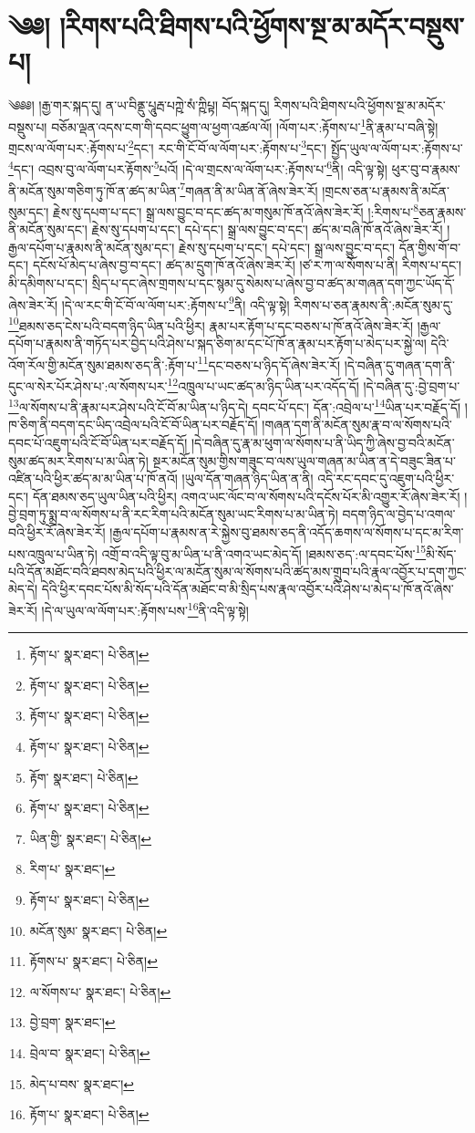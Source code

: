 \setcounter{footnote}{0} 
\chapter{༄༅། །རིགས་པའི་ཐིགས་པའི་ཕྱོགས་སྔ་མ་མདོར་བསྡུས་པ།}༄༅༅། །རྒྱ་གར་སྐད་དུ། ན་ཡ་བིནྡུ་པཱུརྦ་པཀྵེ་སཾ་ཀྵིཔྟ། བོད་སྐད་དུ། རིགས་པའི་ཐིགས་པའི་ཕྱོགས་སྔ་མ་མདོར་བསྡུས་པ། བཅོམ་ལྡན་འདས་ངག་གི་དབང་ཕྱུག་ལ་ཕྱག་འཚལ་ལོ། །ལོག་པར་:རྟོགས་པ་\footnote{རྟོག་པ་  སྣར་ཐང་།  པེ་ཅིན། }ནི་རྣམ་པ་བཞི་སྟེ། གྲངས་ལ་ལོག་པར་:རྟོགས་པ་\footnote{རྟོག་པ་  སྣར་ཐང་།  པེ་ཅིན། }དང་། རང་གི་ངོ་བོ་ལ་ལོག་པར་:རྟོགས་པ་\footnote{རྟོག་པ་  སྣར་ཐང་།  པེ་ཅིན། }དང་། སྤྱོད་ཡུལ་ལ་ལོག་པར་:རྟོགས་པ་\footnote{རྟོག་པ་  སྣར་ཐང་།  པེ་ཅིན། }དང་། འབྲས་བུ་ལ་ལོག་པར་རྟོགས་\footnote{རྟོག་  སྣར་ཐང་།  པེ་ཅིན། }པའོ། །དེ་ལ་གྲངས་ལ་ལོག་པར་:རྟོགས་པ་\footnote{རྟོག་པ་  སྣར་ཐང་།  པེ་ཅིན། }ནི། འདི་ལྟ་སྟེ། ཕུར་བུ་བ་རྣམས་ནི་མངོན་སུམ་གཅིག་ཏུ་ཁོ་ན་ཚད་མ་ཡིན་\footnote{ཡིན་གྱི་  སྣར་ཐང་།  པེ་ཅིན། }གཞན་ནི་མ་ཡིན་ནོ་ཞེས་ཟེར་རོ། །གྲངས་ཅན་པ་རྣམས་ནི་མངོན་སུམ་དང་། རྗེས་སུ་དཔག་པ་དང་། སྒྲ་ལས་བྱུང་བ་དང་ཚད་མ་གསུམ་ཁོ་ནའོ་ཞེས་ཟེར་རོ། །:རིགས་པ་\footnote{རིག་པ་  སྣར་ཐང་། }ཅན་རྣམས་ནི་མངོན་སུམ་དང་། རྗེས་སུ་དཔག་པ་དང་། དཔེ་དང་། སྒྲ་ལས་བྱུང་བ་དང་། ཚད་མ་བཞི་ཁོ་ནའོ་ཞེས་ཟེར་རོ། །རྒྱལ་དཔོག་པ་རྣམས་ནི་མངོན་སུམ་དང་། རྗེས་སུ་དཔག་པ་དང་། དཔེ་དང་། སྒྲ་ལས་བྱུང་བ་དང་། དོན་གྱིས་གོ་བ་དང་། དངོས་པོ་མེད་པ་ཞེས་བྱ་བ་དང་། ཚད་མ་དྲུག་ཁོ་ནའོ་ཞེས་ཟེར་རོ། །ཙ་ར་ཀ་ལ་སོགས་པ་ནི། རིགས་པ་དང་། མི་དམིགས་པ་དང་། སྲིད་པ་དང་ཞེས་གྲགས་པ་དང་སྙམ་དུ་སེམས་པ་ཞེས་བྱ་བ་ཚད་མ་གཞན་དག་ཀྱང་ཡོད་དོ་ཞེས་ཟེར་རོ། །དེ་ལ་རང་གི་ངོ་བོ་ལ་ལོག་པར་:རྟོགས་པ་\footnote{རྟོག་པ་  སྣར་ཐང་།  པེ་ཅིན། }ནི། འདི་ལྟ་སྟེ། རིགས་པ་ཅན་རྣམས་ནི་:མངོན་སུམ་དུ་\footnote{མངོན་སུམ་  སྣར་ཐང་།  པེ་ཅིན། }ཐམས་ཅད་ངེས་པའི་བདག་ཉིད་ཡིན་པའི་ཕྱིར། རྣམ་པར་རྟོག་པ་དང་བཅས་པ་ཁོ་ནའོ་ཞེས་ཟེར་རོ། །རྒྱལ་དཔོག་པ་རྣམས་ནི་གཏོད་པར་བྱེད་པའི་ཤེས་པ་སྐད་ཅིག་མ་དང་པོ་ཁོ་ན་རྣམ་པར་རྟོག་པ་མེད་པར་སྐྱེ་ལ། དེའི་འོག་རོལ་གྱི་མངོན་སུམ་ཐམས་ཅད་ནི་:རྟོག་པ་\footnote{རྟོགས་པ་  སྣར་ཐང་།  པེ་ཅིན། }དང་བཅས་པ་ཉིད་དོ་ཞེས་ཟེར་རོ། །དེ་བཞིན་དུ་གཞན་དག་ནི་དུང་ལ་སེར་པོར་ཤེས་པ་:ལ་སོགས་པར་\footnote{ལ་སོགས་པ་  སྣར་ཐང་།  པེ་ཅིན། }འཁྲུལ་པ་ཡང་ཚད་མ་ཉིད་ཡིན་པར་འདོད་དོ། །དེ་བཞིན་དུ་:བྱེ་བྲག་པ་\footnote{བྱེ་བྲག་  སྣར་ཐང་། }ལ་སོགས་པ་ནི་རྣམ་པར་ཤེས་པའི་ངོ་བོ་མ་ཡིན་པ་ཉིད་དེ། དབང་པོ་དང་། དོན་:འབྲེལ་པ་\footnote{བྲེལ་བ་  སྣར་ཐང་།  པེ་ཅིན། }ཡིན་པར་བརྗོད་དོ། །ཁ་ཅིག་ནི་བདག་དང་ཡིད་འབྲེལ་པའི་ངོ་བོ་ཡིན་པར་བརྗོད་དོ། །གཞན་དག་ནི་མངོན་སུམ་རྣ་བ་ལ་སོགས་པའི་དབང་པོ་འཇུག་པའི་ངོ་བོ་ཡིན་པར་བརྗོད་དོ། །དེ་བཞིན་དུ་རྣ་མ་ཕུག་ལ་སོགས་པ་ནི་ཡིད་ཀྱི་ཞེས་བྱ་བའི་མངོན་སུམ་ཚད་མར་རིགས་པ་མ་ཡིན་ཏེ། སྔར་མངོན་སུམ་གྱིས་གཟུང་བ་ལས་ཡུལ་གཞན་མ་ཡིན་ན་དེ་བཟུང་ཟིན་པ་འཛིན་པའི་ཕྱིར་ཚད་མ་མ་ཡིན་པ་ཁོ་ནའོ། །ཡུལ་དོན་གཞན་ཉིད་ཡིན་ན་ནི། འདི་རང་དབང་དུ་འཇུག་པའི་ཕྱིར་དང་། དོན་ཐམས་ཅད་ཡུལ་ཡིན་པའི་ཕྱིར། འགའ་ཡང་ལོང་བ་ལ་སོགས་པའི་དངོས་པོར་མི་འགྱུར་རོ་ཞེས་ཟེར་རོ། །བྱེ་བྲག་ཏུ་སྨྲ་བ་ལ་སོགས་པ་ནི་རང་རིག་པའི་མངོན་སུམ་ཡང་རིགས་པ་མ་ཡིན་ཏེ། བདག་ཉིད་ལ་བྱེད་པ་འགལ་བའི་ཕྱིར་རོ་ཞེས་ཟེར་རོ། །རྒྱལ་དཔོག་པ་རྣམས་ན་རེ་སྐྱེས་བུ་ཐམས་ཅད་ནི་འདོད་ཆགས་ལ་སོགས་པ་དང་མ་རིག་པས་འཁྲུལ་པ་ཡིན་ཏེ། འགྲོ་བ་འདི་ལྟ་བུ་མ་ཡིན་པ་ནི་འགའ་ཡང་མེད་དོ། །ཐམས་ཅད་:ལ་དབང་པོས་\footnote{མེད་པ་བས་  སྣར་ཐང་། }མི་སོད་པའི་དོན་མཐོང་བའི་ཐབས་མེད་པའི་ཕྱིར་ལ་མངོན་སུམ་ལ་སོགས་པའི་ཚད་མས་གྲུབ་པའི་རྣལ་འབྱོར་པ་དག་ཀྱང་མེད་དེ། དེའི་ཕྱིར་དབང་པོས་མི་སོད་པའི་དོན་མཐོང་བ་མི་སྲིད་པས་རྣལ་འབྱོར་པའི་ཤེས་པ་མེད་པ་ཁོ་ནའོ་ཞེས་ཟེར་རོ། །དེ་ལ་ཡུལ་ལ་ལོག་པར་:རྟོགས་པས་\footnote{རྟོག་པ་  སྣར་ཐང་།  པེ་ཅིན། }ནི་འདི་ལྟ་སྟེ། 